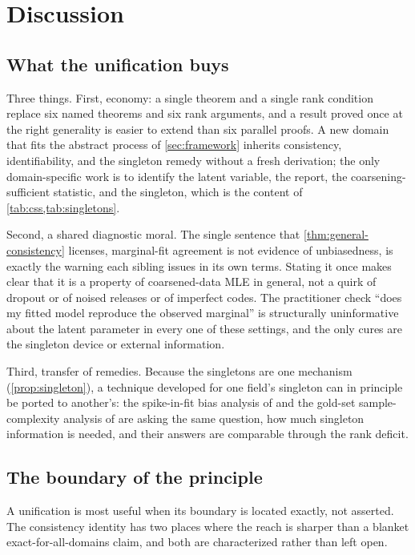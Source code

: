 \section{Discussion}
\label{sec:discussion}

\subsection{What the unification buys}

Three things. First, economy: a single theorem and a single rank
condition replace six named theorems and six rank arguments, and a
result proved once at the right generality is easier to extend than
six parallel proofs. A new domain that fits the abstract process of
\cref{sec:framework} inherits consistency, identifiability, and the
singleton remedy without a fresh derivation; the only domain-specific
work is to identify the latent variable, the report, the
coarsening-sufficient statistic, and the singleton, which is the
content of \cref{tab:css,tab:singletons}.

Second, a shared diagnostic moral. The single sentence that
\cref{thm:general-consistency} licenses, marginal-fit agreement is not
evidence of unbiasedness, is exactly the warning each sibling issues in
its own terms. Stating it once makes clear that it is a property of
coarsened-data MLE in general, not a quirk of dropout or of noised
releases or of imperfect codes. The practitioner check ``does my fitted
model reproduce the observed marginal'' is structurally uninformative
about the latent parameter in every one of these settings, and the only
cures are the singleton device or external information.

Third, transfer of remedies. Because the singletons are one mechanism
(\cref{prop:singleton}), a technique developed for one field's singleton
can in principle be ported to another's: the spike-in-fit bias analysis
of \citet{towell2026scrnacoarsening} and the gold-set sample-complexity
analysis of \citet{towell2026weaksupcoarsening} are asking the same
question, how much singleton information is needed, and their answers
are comparable through the rank deficit.

\subsection{The boundary of the principle}

A unification is most useful when its boundary is located exactly, not
asserted. The consistency identity has two places where the reach is
sharper than a blanket exact-for-all-domains claim, and both are
characterized rather than left open.

